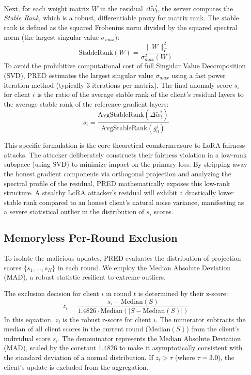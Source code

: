\documentclass[journal]{IEEEtran}
\begin{document}
Next, for each weight matrix $W$ in the residual $\Delta \tilde{w}_t^i$, the server computes the \textit{Stable Rank}, which is a robust, differentiable proxy for matrix rank. The stable rank is defined as the squared Frobenius norm divided by the squared spectral norm (the largest singular value $\sigma_{max}$):
\begin{equation}
\text{StableRank}(W) = \frac{\|W\|_F^2}{\sigma_{max}^2(W)}
\end{equation}
To avoid the prohibitive computational cost of full Singular Value Decomposition (SVD), PRED estimates the largest singular value $\sigma_{max}$ using a fast power iteration method (typically 3 iterations per matrix). The final anomaly score $s_i$ for client $i$ is the ratio of the average stable rank of the client's residual layers to the average stable rank of the reference gradient layers:
\begin{equation}
s_i = \frac{\text{AvgStableRank}(\Delta \tilde{w}_t^i)}{\text{AvgStableRank}(g_0^i)}
\end{equation}

This specific formulation is the core theoretical countermeasure to LoRA fairness attacks. The attacker deliberately constructs their fairness violation in a low-rank subspace (using SVD) to minimize impact on the primary loss. By stripping away the honest gradient components via orthogonal projection and analyzing the spectral profile of the residual, PRED mathematically exposes this low-rank structure. A stealthy LoRA attacker's residual will exhibit a drastically lower stable rank compared to an honest client's natural noise variance, manifesting as a severe statistical outlier in the distribution of $s_i$ scores.

\subsection{Memoryless Per-Round Exclusion}
To isolate the malicious updates, PRED evaluates the distribution of projection scores $\{s_1, \dots, s_N\}$ in each round. We employ the Median Absolute Deviation (MAD), a robust statistic resilient to extreme outliers.

The exclusion decision for client $i$ in round $t$ is determined by their z-score:
\begin{equation}
z_i = \frac{s_i - \text{Median}(S)}{1.4826 \cdot \text{Median}(|S - \text{Median}(S)|)}
\end{equation}
In this equation, $z_i$ is the robust z-score for client $i$. The numerator subtracts the median of all client scores in the current round ($\text{Median}(S)$) from the client's individual score $s_i$. The denominator represents the Median Absolute Deviation (MAD), scaled by the constant 1.4826 to make it asymptotically consistent with the standard deviation of a normal distribution. If $z_i > \tau$ (where $\tau = 3.0$), the client's update is excluded from the aggregation.
\end{document}
